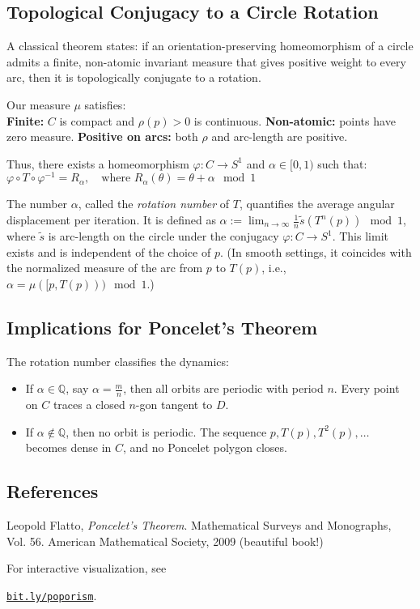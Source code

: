 \begin{technical}
\subsection*{Topological Conjugacy to a Circle Rotation}
A classical theorem states: if an orientation-preserving homeomorphism of a circle admits a finite, non-atomic invariant measure that gives positive weight to every arc, then it is topologically conjugate to a rotation.

Our measure \( \mu \) satisfies:\\
\textbf{Finite:} \( C \) is compact and \( \rho(p) > 0 \) is continuous. \textbf{Non-atomic:} points have zero measure. \textbf{Positive on arcs:} both \( \rho \) and arc-length are positive.

Thus, there exists a homeomorphism \( \varphi: C \to S^1 \) and \( \alpha \in [0,1) \) such that:$ \varphi \circ T \circ \varphi^{-1} = R_\alpha, \quad \text{where } R_\alpha(\theta) = \theta + \alpha \mod 1$

The number \( \alpha \), called the \emph{rotation number} of \( T \), quantifies the average angular displacement per iteration. It is defined as $
\alpha := \lim_{n \to \infty} \frac{1}{n} \tilde{s}(T^n(p)) \mod 1$, where \( \tilde{s} \) is arc-length on the circle under the conjugacy \( \varphi: C \to S^1 \). This limit exists and is independent of the choice of \( p \). (In smooth settings, it coincides with the normalized measure of the arc from \( p \) to \( T(p) \), i.e., \( \alpha = \mu([p, T(p))) \mod 1 \).)

\subsection*{Implications for Poncelet’s Theorem}

The rotation number classifies the dynamics:
\begin{itemize}
  \item If \( \alpha \in \mathbb{Q} \), say \( \alpha = \frac{m}{n} \), then all orbits are periodic with period \( n \). Every point on \( C \) traces a closed \( n \)-gon tangent to \( D \).
  \item If \( \alpha \notin \mathbb{Q} \), then no orbit is periodic. The sequence \( p, T(p), T^2(p), \ldots \) becomes dense in \( C \), and no Poncelet polygon closes.
\end{itemize}

\subsection*{References}
Leopold Flatto, \textit{Poncelet’s Theorem}. Mathematical Surveys and Monographs, Vol. 56. American Mathematical Society, 2009 (beautiful book!)

For interactive visualization, see \par
  \href{https://bit.ly/poporism}{\texttt{bit.ly/poporism}}.
\end{technical}
